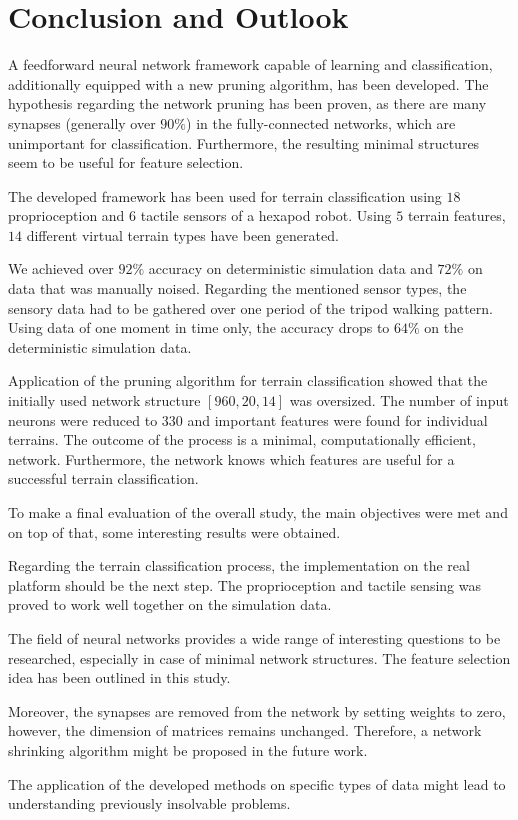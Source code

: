 \chapter{Conclusion and Outlook} \label{chap:conclusion}
A feedforward neural network framework capable of learning and classification, additionally equipped with a new pruning algorithm, has been developed. The hypothesis regarding the network pruning has been proven, as there are many synapses (generally over $ 90\% $) in the fully-connected networks, which are unimportant for classification. Furthermore, the resulting minimal structures seem to be useful for feature selection.

The developed framework has been used for terrain classification using $ 18 $ proprioception and $ 6 $ tactile sensors of a hexapod robot. Using $ 5 $ terrain features, $ 14 $ different virtual terrain types have been generated. 

We achieved over $ 92\% $ accuracy on deterministic simulation data and $ 72\% $ on data that was manually noised. Regarding the mentioned sensor types, the sensory data had to be gathered over one period of the tripod walking pattern. Using data of one moment in time only, the accuracy drops to $ 64\% $ on the deterministic simulation data.

Application of the pruning algorithm for terrain classification showed that the initially used network structure $ [960, 20, 14] $ was oversized. The number of input neurons were reduced to $ 330 $ and important features were found for individual terrains. The outcome of the process is a minimal, computationally efficient, network. Furthermore, the network knows which features are useful for a successful terrain classification. 

To make a final evaluation of the overall study, the main objectives were met and on top of that, some interesting results were obtained. 

Regarding the terrain classification process, the implementation on the real platform should be the next step. The proprioception and tactile sensing was proved to work well together on the simulation data.

The field of neural networks provides a wide range of interesting questions to be researched, especially in case of minimal network structures. The feature selection idea has been outlined in this study. 

Moreover, the synapses are removed from the network by setting weights to zero, however, the dimension of matrices remains unchanged. Therefore, a network shrinking algorithm might be proposed in the future work.

The application of the developed methods on specific types of data might lead to understanding previously insolvable problems.
